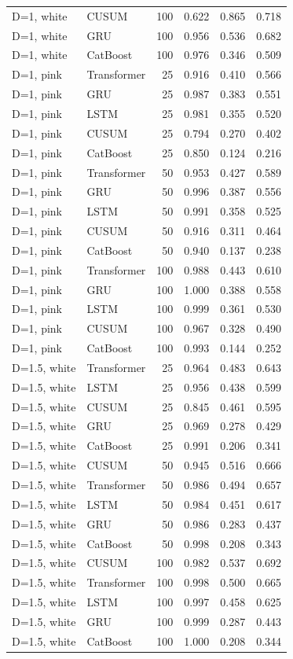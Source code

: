 \begin{tabular}{llrrrr}
D=1, white & CUSUM & 100 & 0.622 & 0.865 & 0.718 \\
D=1, white & GRU & 100 & 0.956 & 0.536 & 0.682 \\
D=1, white & CatBoost & 100 & 0.976 & 0.346 & 0.509 \\
D=1, pink & Transformer & 25 & 0.916 & 0.410 & 0.566 \\
D=1, pink & GRU & 25 & 0.987 & 0.383 & 0.551 \\
D=1, pink & LSTM & 25 & 0.981 & 0.355 & 0.520 \\
D=1, pink & CUSUM & 25 & 0.794 & 0.270 & 0.402 \\
D=1, pink & CatBoost & 25 & 0.850 & 0.124 & 0.216 \\
D=1, pink & Transformer & 50 & 0.953 & 0.427 & 0.589 \\
D=1, pink & GRU & 50 & 0.996 & 0.387 & 0.556 \\
D=1, pink & LSTM & 50 & 0.991 & 0.358 & 0.525 \\
D=1, pink & CUSUM & 50 & 0.916 & 0.311 & 0.464 \\
D=1, pink & CatBoost & 50 & 0.940 & 0.137 & 0.238 \\
D=1, pink & Transformer & 100 & 0.988 & 0.443 & 0.610 \\
D=1, pink & GRU & 100 & 1.000 & 0.388 & 0.558 \\
D=1, pink & LSTM & 100 & 0.999 & 0.361 & 0.530 \\
D=1, pink & CUSUM & 100 & 0.967 & 0.328 & 0.490 \\
D=1, pink & CatBoost & 100 & 0.993 & 0.144 & 0.252 \\
D=1.5, white & Transformer & 25 & 0.964 & 0.483 & 0.643 \\
D=1.5, white & LSTM & 25 & 0.956 & 0.438 & 0.599 \\
D=1.5, white & CUSUM & 25 & 0.845 & 0.461 & 0.595 \\
D=1.5, white & GRU & 25 & 0.969 & 0.278 & 0.429 \\
D=1.5, white & CatBoost & 25 & 0.991 & 0.206 & 0.341 \\
D=1.5, white & CUSUM & 50 & 0.945 & 0.516 & 0.666 \\
D=1.5, white & Transformer & 50 & 0.986 & 0.494 & 0.657 \\
D=1.5, white & LSTM & 50 & 0.984 & 0.451 & 0.617 \\
D=1.5, white & GRU & 50 & 0.986 & 0.283 & 0.437 \\
D=1.5, white & CatBoost & 50 & 0.998 & 0.208 & 0.343 \\
D=1.5, white & CUSUM & 100 & 0.982 & 0.537 & 0.692 \\
D=1.5, white & Transformer & 100 & 0.998 & 0.500 & 0.665 \\
D=1.5, white & LSTM & 100 & 0.997 & 0.458 & 0.625 \\
D=1.5, white & GRU & 100 & 0.999 & 0.287 & 0.443 \\
D=1.5, white & CatBoost & 100 & 1.000 & 0.208 & 0.344 \\
\bottomrule
\end{tabular}
